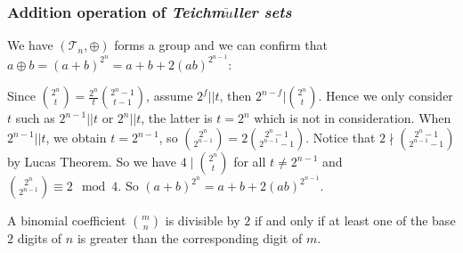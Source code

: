 \documentclass[
    aspectratio=169,                   %
]{beamer}
\renewcommand{\Bbb}{\mathbb}
\newcommand{\Z}{\mathbb{Z}}
\newcommand{\GR}{\mathbb{GR}}
\newcommand{\gtr}{\operatorname{T}}
\newcommand{\teich}{\textit{Teichm$\ddot{u}$ller sets}}
\begin{document}
    \begin{frame}
        \frametitle{Addition operation of \teich }
    
        
        We have $ (\mathcal{T}_n,\oplus) $ forms a group and we can confirm that $ a\oplus b=(a+b)^{2^n}=a+b+2(ab)^{2^{n-1}} $:
        
        Since $ \binom{2^n}{t}=\frac{2^n}{t}\binom{2^n-1}{t-1} $, 
        assume $ 2^f||t $, then $ 2^{n-f}|\binom{2^n}{t} $. Hence we only consider $ t $ such as $ 2^{n-1}||t $ or $ 2^n||t $, 
        the latter is $ t=2^n $ which is not in consideration. 
        When $ 2^{n-1}||t $, we obtain $ t=2^{n-1} $, so $ \binom{2^n}{2^{n-1}}=2\binom{2^n-1}{2^{n-1}-1} $. 
        Notice that $ 2\nmid\binom{2^n-1}{2^{n-1}-1} $ by Lucas Theorem. 
        So we have $ 4\mid\binom{2^n}{t} $ for all $ t\neq 2^{n-1} $ and $ \binom{2^n}{2^{n-1}}\equiv 2\mod{4} $. 
        So $ (a+b)^{2^n}=a+b+2(ab)^{2^{n-1}} $.
        \begin{remark}
            A binomial coefficient $\binom{m}{n}$ is divisible by $2$ if and only if at least one of the base $2$ digits of $n$ is greater than the corresponding digit of $m$.
        \end{remark}
    \end{frame}
        
    
        
    
    
\end{document}
